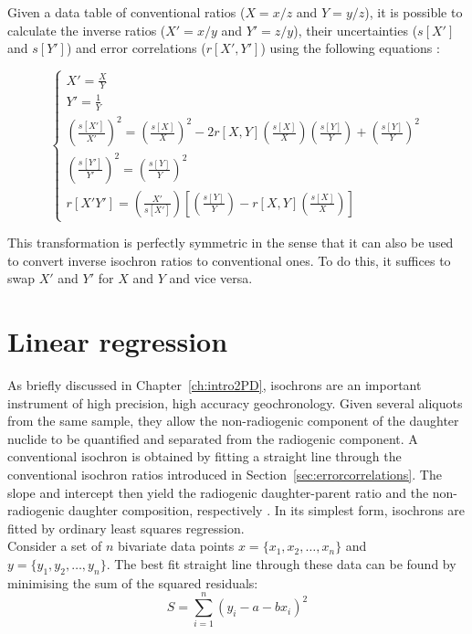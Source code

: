 \begin{refsection}
Given a data table of conventional ratios ($X=x/z$ and $Y=y/z$), it is
possible to calculate the inverse ratios ($X'=x/y$ and $Y'=z/y$),
their uncertainties ($s[X']$ and $s[Y']$) and error correlations
($r[X',Y']$) using the following equations \citep{li2021}:

\begin{equation}
  \begin{cases}
    X' = \frac{X}{Y} \\
    Y' = \frac{1}{Y} \\
    \left(\frac{s[X']}{X'}\right)^2 =
    \left(\frac{s[X]}{X}\right)^2 -
    2 r[X,Y]\left(\frac{s[X]}{X}\right)\left(\frac{s[Y]}{Y}\right) +
    \left(\frac{s[Y]}{Y}\right)^2 \\
    \left(\frac{s[Y']}{Y'}\right)^2 = \left(\frac{s[Y]}{Y}\right)^2 \\
    r[X'Y'] =
    \left(\frac{X'}{s[X']}\right)
    \left[
    \left(\frac{s[Y]}{Y}\right) -
    r[X,Y]\left(\frac{s[X]}{X}\right)
    \right]
  \end{cases}
  \label{eq:transformation}
\end{equation}

This transformation is perfectly symmetric in the sense that it can
also be used to convert inverse isochron ratios to conventional
ones. To do this, it suffices to swap $X'$ and $Y'$ for $X$ and $Y$
and vice versa.

\section{Linear regression}
\label{sec:regression}

As briefly discussed in Chapter~\ref{ch:intro2PD}, isochrons are an
important instrument of high precision, high accuracy geochronology.
Given several aliquots from the same sample, they allow the
non-radiogenic component of the daughter nuclide to be quantified and
separated from the radiogenic component. A conventional isochron is
obtained by fitting a straight line through the conventional isochron
ratios introduced in Section~\ref{sec:errorcorrelations}. The slope
and intercept then yield the radiogenic daughter-parent ratio and the
non-radiogenic daughter composition, respectively
\citep{nicolaysen1961}. In its simplest form, isochrons are fitted by
ordinary least squares regression.\\

Consider a set of $n$ bivariate data points $x =
\{x_1,x_2,\ldots,x_n\}$ and $y = \{y_1,y_2,\ldots,y_n\}$.  The best
fit straight line through these data can be found by minimising the
sum of the squared residuals:
\begin{equation}
  S = \sum\limits_{i=1}^{n}\left( y_i - a - b x_i \right)^2
  \label{eq:S}
\end{equation}


\end{refsection}
